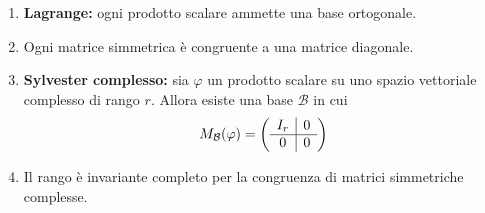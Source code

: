 \documentclass[a4paper,11pt]{article}
\begin{document}
\begin{enumerate}[resume]
	\item\textbf{Lagrange:} ogni prodotto scalare ammette una base ortogonale.
	\item Ogni matrice simmetrica è congruente a una matrice diagonale.
	\item \textbf{Sylvester complesso:} sia $\varphi$ un prodotto scalare su uno spazio vettoriale complesso di rango $r$. Allora esiste una base $\mathcal{B}$ in cui
	\[M_\mathcal{B}(\varphi)=\left(\begin{array}{c | c}
	I_r & 0 \\
	\hline
	0 & 0 \\
	\end{array}\right)\]
	\item Il rango è invariante completo per la congruenza di matrici simmetriche complesse.
\end{enumerate}
\end{document}
